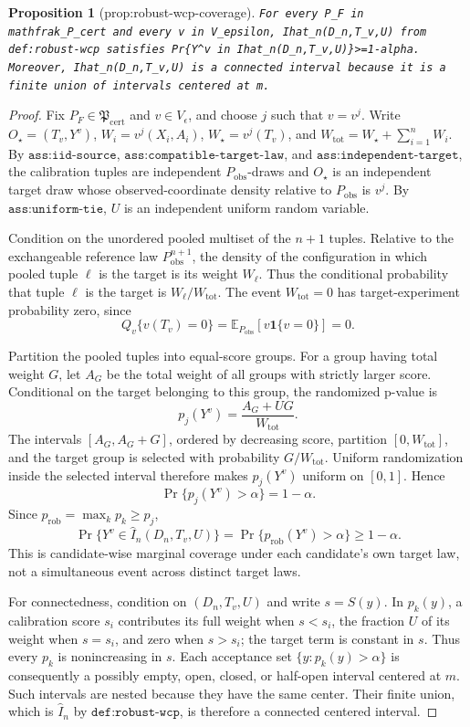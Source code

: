 \documentclass{article}
\newtheorem{proposition}{Proposition}
\begin{document}
\begin{proposition}[prop:robust-wcp-coverage]\label{prop:robust-wcp-coverage}
\texttt{For every P\_F in mathfrak\_P\_cert and every v in V\_epsilon, Ihat\_n(D\_n,T\_v,U) from def:robust-wcp satisfies Pr\{Y\textasciicircum{}v in Ihat\_n(D\_n,T\_v,U)\}>=1-alpha. Moreover, Ihat\_n(D\_n,T\_v,U) is a connected interval because it is a finite union of intervals centered at m.}
\end{proposition}
\begin{proof}
Fix \(P_F\in\mathfrak P_{\mathrm{cert}}\) and \(v\in V_\epsilon\), and choose \(j\) such that \(v=v^j\). Write \(O_\star=(T_v,Y^v)\), \(W_i=v^j(X_i,A_i)\), \(W_\star=v^j(T_v)\), and \(W_{\mathrm{tot}}=W_\star+\sum_{i=1}^nW_i\). By \(\texttt{ass:iid-source}\), \(\texttt{ass:compatible-target-law}\), and \(\texttt{ass:independent-target}\), the calibration tuples are independent \(P_{\mathrm{obs}}\)-draws and \(O_\star\) is an independent target draw whose observed-coordinate density relative to \(P_{\mathrm{obs}}\) is \(v^j\). By \(\texttt{ass:uniform-tie}\), \(U\) is an independent uniform random variable.

Condition on the unordered pooled multiset of the \(n+1\) tuples. Relative to the exchangeable reference law \(P_{\mathrm{obs}}^{n+1}\), the density of the configuration in which pooled tuple \(\ell\) is the target is its weight \(W_\ell\). Thus the conditional probability that tuple \(\ell\) is the target is \(W_\ell/W_{\mathrm{tot}}\). The event \(W_{\mathrm{tot}}=0\) has target-experiment probability zero, since
\[
Q_v\{v(T_v)=0\}=\mathbb E_{P_{\mathrm{obs}}}[v\mathbf 1\{v=0\}]=0.
\]

Partition the pooled tuples into equal-score groups. For a group having total weight \(G\), let \(A_G\) be the total weight of all groups with strictly larger score. Conditional on the target belonging to this group, the randomized p-value is
\[
p_j(Y^v)=\frac{A_G+UG}{W_{\mathrm{tot}}}.
\]
The intervals \([A_G,A_G+G]\), ordered by decreasing score, partition \([0,W_{\mathrm{tot}}]\), and the target group is selected with probability \(G/W_{\mathrm{tot}}\). Uniform randomization inside the selected interval therefore makes \(p_j(Y^v)\) uniform on \([0,1]\). Hence
\[
\Pr\{p_j(Y^v)>\alpha\}=1-\alpha.
\]
Since \(p_{\mathrm{rob}}=\max_kp_k\ge p_j\),
\[
\Pr\{Y^v\in\widehat I_n(D_n,T_v,U)\}
=\Pr\{p_{\mathrm{rob}}(Y^v)>\alpha\}\ge1-\alpha.
\]
This is candidate-wise marginal coverage under each candidate's own target law, not a simultaneous event across distinct target laws.

For connectedness, condition on \((D_n,T_v,U)\) and write \(s=S(y)\). In \(p_k(y)\), a calibration score \(s_i\) contributes its full weight when \(s<s_i\), the fraction \(U\) of its weight when \(s=s_i\), and zero when \(s>s_i\); the target term is constant in \(s\). Thus every \(p_k\) is nonincreasing in \(s\). Each acceptance set \(\{y:p_k(y)>\alpha\}\) is consequently a possibly empty, open, closed, or half-open interval centered at \(m\). Such intervals are nested because they have the same center. Their finite union, which is \(\widehat I_n\) by \(\texttt{def:robust-wcp}\), is therefore a connected centered interval.
\end{proof}
\end{document}
